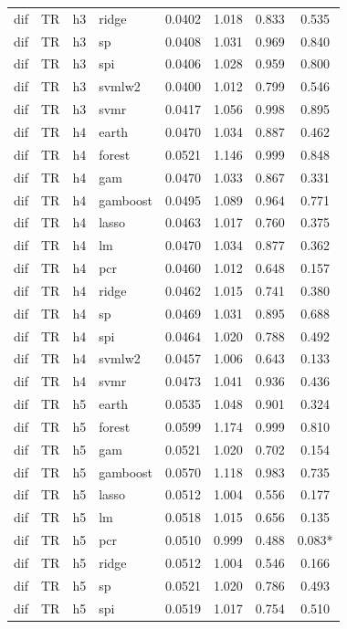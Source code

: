 \begin{ThreePartTable}
\begin{longtable}[t]{llclcccc}
dif & TR & h3 & ridge & 0.0402 & 1.018 & 0.833 & 0.535\\
dif & TR & h3 & sp & 0.0408 & 1.031 & 0.969 & 0.840\\
dif & TR & h3 & spi & 0.0406 & 1.028 & 0.959 & 0.800\\
dif & TR & h3 & svmlw2 & 0.0400 & 1.012 & 0.799 & 0.546\\
dif & TR & h3 & svmr & 0.0417 & 1.056 & 0.998 & 0.895\\
\addlinespace
dif & TR & h4 & earth & 0.0470 & 1.034 & 0.887 & 0.462\\
dif & TR & h4 & forest & 0.0521 & 1.146 & 0.999 & 0.848\\
dif & TR & h4 & gam & 0.0470 & 1.033 & 0.867 & 0.331\\
dif & TR & h4 & gamboost & 0.0495 & 1.089 & 0.964 & 0.771\\
dif & TR & h4 & lasso & 0.0463 & 1.017 & 0.760 & 0.375\\
dif & TR & h4 & lm & 0.0470 & 1.034 & 0.877 & 0.362\\
dif & TR & h4 & pcr & 0.0460 & 1.012 & 0.648 & 0.157\\
dif & TR & h4 & ridge & 0.0462 & 1.015 & 0.741 & 0.380\\
dif & TR & h4 & sp & 0.0469 & 1.031 & 0.895 & 0.688\\
dif & TR & h4 & spi & 0.0464 & 1.020 & 0.788 & 0.492\\
dif & TR & h4 & svmlw2 & 0.0457 & 1.006 & 0.643 & 0.133\\
dif & TR & h4 & svmr & 0.0473 & 1.041 & 0.936 & 0.436\\
\addlinespace
dif & TR & h5 & earth & 0.0535 & 1.048 & 0.901 & 0.324\\
dif & TR & h5 & forest & 0.0599 & 1.174 & 0.999 & 0.810\\
dif & TR & h5 & gam & 0.0521 & 1.020 & 0.702 & 0.154\\
dif & TR & h5 & gamboost & 0.0570 & 1.118 & 0.983 & 0.735\\
dif & TR & h5 & lasso & 0.0512 & 1.004 & 0.556 & 0.177\\
dif & TR & h5 & lm & 0.0518 & 1.015 & 0.656 & 0.135\\
dif & TR & h5 & pcr & 0.0510 & 0.999 & 0.488 & 0.083*\\
dif & TR & h5 & ridge & 0.0512 & 1.004 & 0.546 & 0.166\\
dif & TR & h5 & sp & 0.0521 & 1.020 & 0.786 & 0.493\\
dif & TR & h5 & spi & 0.0519 & 1.017 & 0.754 & 0.510\\

\end{longtable}
\end{ThreePartTable}
